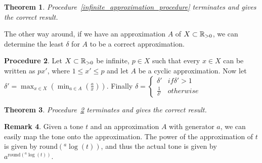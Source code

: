 \documentclass[a4paper]{article}
\newtheorem{theorem}{Theorem}[section]
\theoremstyle{definition}
\newtheorem{remark}[theorem]{Remark}
\newtheorem{procedure}[theorem]{Procedure}
\begin{document}
\begin{theorem}
	Procedure~\ref{infinite_approximation_procedure} terminates and gives the correct result.
\end{theorem}

The other way around, if we have an approximation $A$ of $X \subset \mathbb{R}_{> 0}$, we can determine the least $\delta$ for $A$ to be a correct approximation.
\begin{procedure}
	Let $X \subset \mathbb{R}_{> 0}$ be infinite, $p \in X$ such that every $x \in X$ can be written as $px'$, where $1 \leq x' \leq p$ and let $A$ be a cyclic approximation.
	Now let $\delta' = \max_{x \in X}(\min_{a \in A}(\frac{a}{x}))$.
	Finally $\delta = \left\{
		\begin{array}{ll}
			\delta' 		& if \delta' > 1\\ 
			\frac{1}{\delta'} 	& otherwise
		\end{array} 
		\right.$
	\label{delta_determination_procedure}
\end{procedure}

\begin{theorem}
	Procedure~\ref{delta_determination_procedure} terminates and gives the correct result.
\end{theorem} 

\begin{remark}
	Given a tone $t$ and an approximation $A$ with generator $a$, we can easily map the tone onto the approximation.
	The power of the approximation of $t$ is given by $\mathrm{round}(^a\log(t))$, and thus the actual tone is given by $a^{\mathrm{round}(^a\log(t))}$.
\end{remark}
\end{document}
